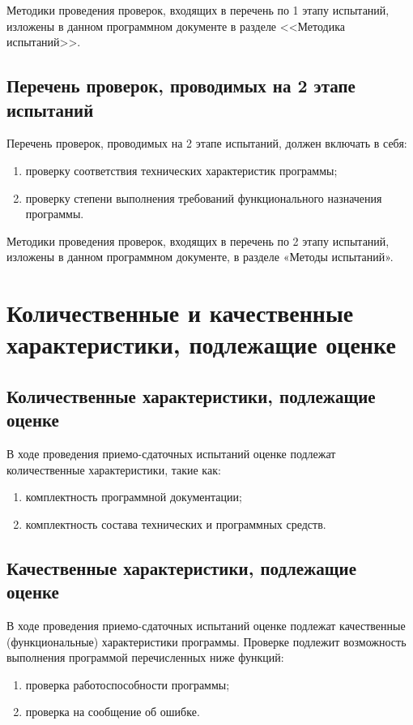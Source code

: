 \documentclass[14pt,a4paper,final]{extreport}
\begin{document}
Методики проведения проверок, входящих в перечень по 1 этапу испытаний, изложены в данном программном документе в разделе <<Методика испытаний>>.

\subsection{Перечень проверок, проводимых на 2 этапе испытаний}
Перечень проверок, проводимых на 2 этапе испытаний, должен включать в себя:

\begin{enumerate}
	\item[а)] проверку соответствия технических характеристик программы;
	\item[б)] проверку степени выполнения требований функционального назначения программы.
\end{enumerate}

Методики проведения проверок, входящих в перечень по 2 этапу испытаний, изложены в
данном программном документе, в разделе «Методы испытаний».

\section{Количественные и качественные характеристики, подлежащие оценке}

\subsection{Количественные характеристики, подлежащие оценке}
В ходе проведения приемо-сдаточных испытаний оценке подлежат количественные
характеристики, такие как:

\begin{enumerate}
	\item[а)] комплектность программной документации;
	\item[б)] комплектность состава технических и программных средств.
\end{enumerate}

\subsection{Качественные характеристики, подлежащие оценке}
В ходе проведения приемо-сдаточных испытаний оценке подлежат качественные (функциональные) характеристики программы. Проверке подлежит возможность выполнения программой перечисленных ниже функций:

\begin{enumerate}
	\item[а)] проверка работоспособности программы;
	\item[б)] проверка на сообщение об ошибке.
\end{enumerate}
\end{document}
